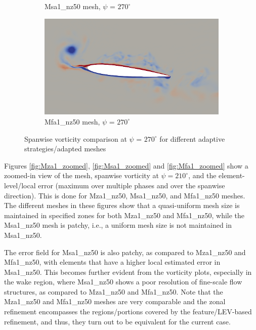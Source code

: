 \begin{figure}[H]
\begin{subfigure}[b]{0.475\textwidth}
\caption{Msa1\_nz50 mesh, $\psi$ = $270^\circ$}
\label{fig:hadapt_psi270}
\end{subfigure}
\begin{subfigure}[b]{0.475\textwidth}
\centering
\includegraphics[width=1\textwidth]{figures/adapt_strat/vorticity_plots/Mfa1_50/phase_270.png}
\caption{Mfa1\_nz50 mesh, $\psi$ = $270^\circ$}
\label{fig:FB_psi270}
\end{subfigure}
\caption{Spanwise vorticity comparison at $\psi$ = $270^\circ$ for different adaptive strategies/adapted meshes}
\label{fig:vorticity_270}
\end{figure}

Figures \ref{fig:Mza1_zoomed}, \ref{fig:Msa1_zoomed} and \ref{fig:Mfa1_zoomed} show a zoomed-in view of the mesh, spanwise vorticity at $\psi=210^\circ$, and the element-level/local error (maximum over multiple phases and over the spanwise direction). This is done for Mza1\_nz50, Msa1\_nz50, and Mfa1\_nz50 meshes.
The different meshes in these figures show that a quasi-uniform mesh size is maintained in specified zones for both Mza1\_nz50 and Mfa1\_nz50, while the Msa1\_nz50 mesh is patchy, i.e., a uniform mesh size is not maintained in Msa1\_nz50.

The error field for Msa1\_nz50 is also patchy, as compared to Mza1\_nz50 and Mfa1\_nz50, with elements that have a higher local estimated error in Msa1\_nz50.
This becomes further evident from the vorticity plots, especially in the wake region, where Msa1\_nz50 shows a poor resolution of fine-scale flow structures, as compared to Mza1\_nz50 and Mfa1\_nz50.
Note that the Mza1\_nz50 and Mfa1\_nz50 meshes are very comparable and the zonal refinement encompasses the regions/portions covered by the feature/LEV-based refinement, and thus, they turn out to be equivalent for the current case.


